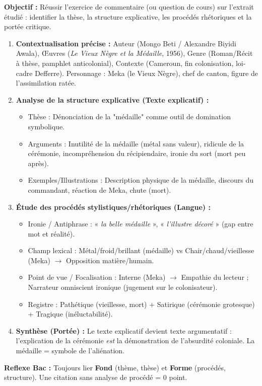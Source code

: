 \documentclass[11pt]{article}
\newcommand{\cle}[1]{{\popxbold\color{popdark}#1}}
\begin{document}
\begin{methode}
    \textbf{Objectif :} Réussir l'exercice de commentaire (ou question de cours) sur l'extrait étudié : identifier la \cle{thèse}, la \cle{structure explicative}, les \cle{procédés rhétoriques} et la \cle{portée critique}.
    \begin{enumerate}
        \item \textbf{Contextualisation précise :} Auteur (Mongo Beti / Alexandre Biyidi Awala), Œuvres (\emph{Le Vieux Nègre et la Médaille}, 1956), Genre (Roman/Récit à thèse, pamphlet anticolonial), Contexte (Cameroun, fin colonisation, loi-cadre Defferre). Personnage : \cle{Meka} (le Vieux Nègre), chef de canton, figure de l'assimilation ratée.
        \item \textbf{Analyse de la structure explicative (Texte explicatif) :} 
            \begin{itemize}
                \item \cle{Thèse} : Dénonciation de la "médaille" comme outil de domination symbolique.
                \item \cle{Arguments} : Inutilité de la médaille (métal sans valeur), ridicule de la cérémonie, incompréhension du récipiendaire, ironie du sort (mort peu après).
                \item \cle{Exemples/Illustrations} : Description physique de la médaille, discours du commandant, réaction de Meka, chute (mort).
            \end{itemize}
        \item \textbf{Étude des procédés stylistiques/rhétoriques (Langue) :}
            \begin{itemize}
                \item \cle{Ironie / Antiphrase} : « \emph{la belle médaille} », « \emph{l'illustre décoré} » (gap entre mot et réalité).
                \item \cle{Champ lexical} : Métal/froid/brillant (médaille) vs Chair/chaud/vieillesse (Meka) $\rightarrow$ Opposition matière/humain.
                \item \cle{Point de vue / Focalisation} : Interne (Meka) $\rightarrow$ Empathie du lecteur ; Narrateur omniscient ironique (jugement sur le colonisateur).
                \item \cle{Registre} : \cle{Pathétique} (vieillesse, mort) + \cle{Satirique} (cérémonie grotesque) + \cle{Tragique} (inéluctabilité).
            \end{itemize}
        \item \textbf{Synthèse (Portée) :} Le texte explicatif devient \cle{texte argumentatif} : l'explication de la cérémonie \emph{est} la démonstration de l'absurdité coloniale. La médaille = \cle{symbole} de l'aliénation.
    \end{enumerate}
    \textbf{Reflexe Bac :} Toujours lier \textbf{Fond} (thème, thèse) et \textbf{Forme} (procédés, structure). Une citation sans analyse de procédé = 0 point.
\end{methode}
\end{document}
